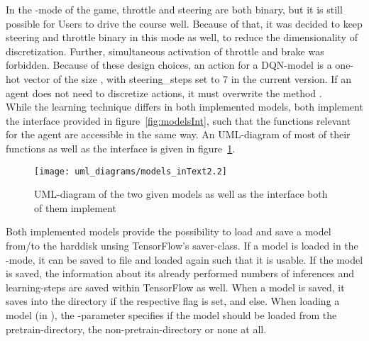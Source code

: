 In the -mode of the game, throttle and steering are both binary, but it is still possible for Users to drive the course well. Because of that, it was decided to keep steering and throttle binary in this mode as well, to reduce the dimensionality of discretization. Further, simultaneous activation of throttle and brake was forbidden. Because of these design choices, an action for a DQN-model is a one-hot vector of the size , with steering\_steps set to 7 in the current version. If an agent does not need to discretize actions, it must overwrite the method .\\

\noindent While the learning technique differs in both implemented models, both implement the interface provided in figure~\ref{fig:modelsInt}, such that the functions relevant for the agent are accessible in the same way. An UML-diagram of most of their functions as well as the interface is given in figure~\ref{fig:modelssmall}. 

\begin{figure}[h]
	\centering 
	\texttt{[image: uml\_diagrams/models\_inText2.2]}
	\caption[UML-diagram of the two models and their interface]{UML-diagram of the two given models as well as the interface both of them implement}
	\label{fig:modelssmall}
\end{figure}

Both implemented models provide the possibility to load and save a model from/to the harddisk unsing TensorFlow's saver-class. If a model is loaded in the -mode, it can be saved to file and loaded again such that it is usable. If the model is saved, the information about its already performed numbers of inferences and learning-steps are saved within TensorFlow as well. When a model is saved, it saves into the directory  if the respective flag is set, and  else. When loading a model (in ), the -parameter specifies if the model should be loaded from the pretrain-directory, the non-pretrain-directory or none at all.



